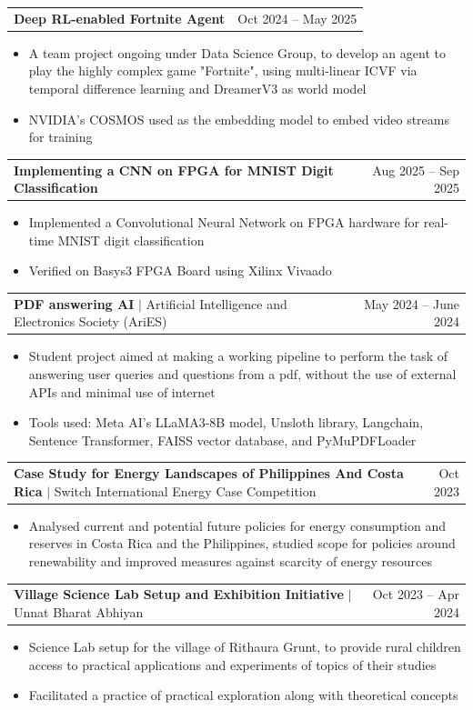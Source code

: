 \documentclass[letterpaper,11pt]{article}
\makeatletter
\newcommand{\resumeItem}[1]{
  \item\small{
    {#1 \vspace{-2pt}}
  }
}
\newcommand{\resumeProjectHeading}[2]{
    \item
    \begin{tabular*}{0.97\textwidth}{l@{\extracolsep{\fill}}r}
      \small#1 & \small#2 \\
    \end{tabular*}\vspace{-7pt}
}
\newcommand{\resumeItemListStart}{\begin{itemize}}
\newcommand{\resumeItemListEnd}{\end{itemize}\vspace{-9pt}}
\makeatother
\begin{document}
      \resumeProjectHeading
          {\textbf{Deep RL-enabled Fortnite Agent}}
          {Oct 2024 -- May 2025}
          \resumeItemListStart
            \resumeItem{A team project ongoing under Data Science Group, to develop an agent to play the highly complex game "Fortnite", using multi-linear ICVF via temporal difference learning and DreamerV3 as world model}
            \resumeItem{NVIDIA's COSMOS used as the embedding model to embed video streams for training}
          \resumeItemListEnd

      \resumeProjectHeading
          {\textbf{Implementing a CNN on FPGA for MNIST Digit Classification}}
          {Aug 2025 -- Sep 2025}
          \resumeItemListStart
            \resumeItem{Implemented a Convolutional Neural Network on FPGA hardware for real-time MNIST digit classification}
            \resumeItem{Verified on Basys3 FPGA Board using Xilinx Vivaado}
          \resumeItemListEnd

\clearpage

      \resumeProjectHeading
          {\textbf{PDF answering AI} $|$ Artificial Intelligence and Electronics Society (AriES)}
          {May 2024 -- June 2024}
          \resumeItemListStart
            \resumeItem{Student project aimed at making a working pipeline to perform the task of answering user queries and questions from a pdf, without the use of external APIs and minimal use of internet}
            \resumeItem{Tools used: Meta AI's LLaMA3-8B model, Unsloth library, Langchain, Sentence Transformer, FAISS vector database, and PyMuPDFLoader}
          \resumeItemListEnd

      \resumeProjectHeading
          {\textbf{Case Study for Energy Landscapes of Philippines And Costa Rica} $|$ Switch International Energy Case Competition}
          {Oct 2023}
          \resumeItemListStart
            \resumeItem{Analysed current and potential future policies for energy consumption and reserves in Costa Rica and the Philippines, studied scope for policies around renewability and improved measures against scarcity of energy resources}
          \resumeItemListEnd

      \resumeProjectHeading
          {\textbf{Village Science Lab Setup and Exhibition Initiative} $|$ Unnat Bharat Abhiyan}
          {Oct 2023 -- Apr 2024}
          \resumeItemListStart
            \resumeItem{Science Lab setup for the village of Rithaura Grunt, to provide rural children access to practical applications and experiments of topics of their studies}
            \resumeItem{Facilitated a practice of practical exploration along with theoretical concepts}
          \resumeItemListEnd
\end{document}
